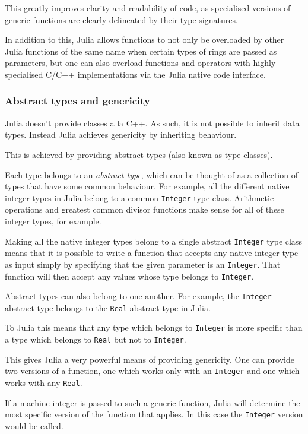 \documentclass[a4paper,10pt]{article}
\newcommand{\code}{\lstinline}
\begin{document}
This greatly improves clarity and readability of code, as specialised versions of generic functions are
clearly delineated by their type signatures.

In addition to this, Julia allows functions to not only be overloaded by other Julia functions of the
same name when certain types of rings are passed as parameters, but one can also overload functions
and operators with highly specialised C/C++ implementations via the Julia native code interface.

\subsubsection{Abstract types and genericity}

Julia doesn't provide classes a la C++. As such, it is not possible to inherit data types. Instead
Julia achieves genericity by inheriting behaviour.

This is achieved by providing abstract types (also known as type classes).

Each type belongs to an \emph{abstract type}, which can be thought of as a collection of types that
have some common behaviour. For example, all the different native integer types in Julia belong to a
common \code{Integer} type class. Arithmetic operations and greatest common divisor functions
make sense for all of these integer types, for example.

Making all the native integer types belong to a single abstract \code{Integer} type class means that it
is possible to write a function that accepts any native integer type as input simply by specifying that
the given parameter is an \code{Integer}. That function will then accept any values whose type belongs
to \code{Integer}.

Abstract types can also belong to one another. For example, the \code{Integer} abstract type belongs to
the \code{Real} abstract type in Julia. 

To Julia this means that any type which belongs to \code{Integer} is more specific than a type which
belongs to \code{Real} but not to \code{Integer}.

This gives Julia a very powerful means of providing genericity. One can provide two versions of a
function, one which works only with an \code{Integer} and one which works with any \code{Real}.

If a machine integer is passed to such a generic function, Julia will determine the most specific
version of the function that applies. In this case the \code{Integer} version would be called.
\end{document}
